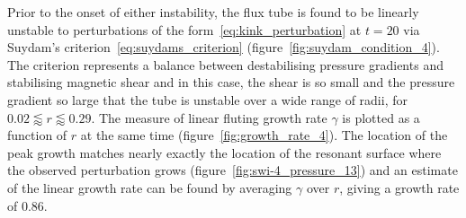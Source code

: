 \documentclass[fleqn,usenatbib]{mnras}
\begin{document}
Prior to the onset of either instability, the flux tube is found to be linearly
unstable to perturbations of the form~\eqref{eq:kink_perturbation} at $t=20$
via Suydam's criterion~\eqref{eq:suydams_criterion}
(figure~\ref{fig:suydam_condition_4}). The criterion represents a balance
between destabilising pressure gradients and stabilising magnetic shear and in
this case, the shear is so small and the pressure gradient so large that the
tube is unstable over a wide range of radii, for $ 0.02 \lessapprox
r \lessapprox 0.29$. The measure of linear fluting growth rate $\gamma$ is
plotted as a function of $r$ at the same time (figure~\ref{fig:growth_rate_4}).
The location of the peak growth matches nearly exactly the location of the
resonant surface where the observed perturbation grows
(figure~\ref{fig:swi-4_pressure_13}) and an estimate of the linear growth rate
can be found by averaging $\gamma$ over $r$, giving a growth rate of $0.86$.
\end{document}
